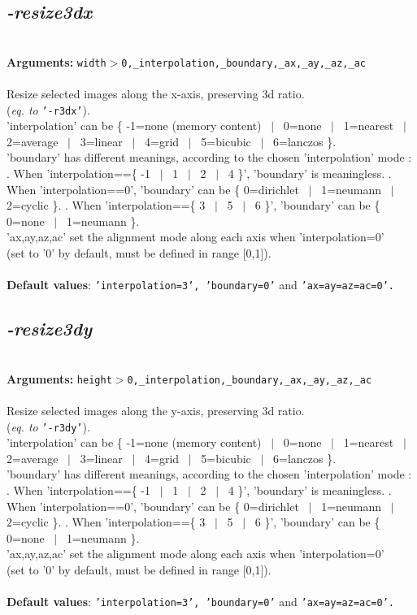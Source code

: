 \documentclass[a4paper,11pt,twoside]{book}
\begin{document}
\subsection{\emph{-resize3dx} }\vspace*{-0.5em}
~\\\textbf{Arguments: } 
{\small \texttt{width$>$0,\_interpolation,\_boundary,\_ax,\_ay,\_az,\_ac}}\\~\\
Resize selected images along the x-axis, preserving 3d ratio.
~\\(\emph{eq. to} {\small \texttt{'-r3dx'}}).
~\\'interpolation' can be \{ -1=none (memory content) ~$|$~ 0=none ~$|$~ 1=nearest ~$|$~ 2=average ~$|$~ 3=linear ~$|$~ 4=grid ~$|$~ 5=bicubic ~$|$~ 6=lanczos \}.
~\\'boundary' has different meanings, according to the chosen 'interpolation' mode :
. When 'interpolation==\{ -1 ~$|$~ 1 ~$|$~ 2 ~$|$~ 4 \}', 'boundary' is meaningless.
. When 'interpolation==0', 'boundary' can be \{ 0=dirichlet ~$|$~ 1=neumann ~$|$~ 2=cyclic \}.
. When 'interpolation==\{ 3 ~$|$~ 5 ~$|$~ 6 \}', 'boundary' can be \{ 0=none ~$|$~ 1=neumann \}.
~\\'ax,ay,az,ac' set the alignment mode along each axis when 'interpolation=0'
~\\(set to '0' by default, must be defined in range [0,1]).
~\\~\\\textbf{Default values}: {\small \texttt{'interpolation=3', 'boundary=0'} and \texttt{'ax=ay=az=ac=0'.}}


\subsection{\emph{-resize3dy} }\vspace*{-0.5em}
~\\\textbf{Arguments: } 
{\small \texttt{height$>$0,\_interpolation,\_boundary,\_ax,\_ay,\_az,\_ac}}\\~\\
Resize selected images along the y-axis, preserving 3d ratio.
~\\(\emph{eq. to} {\small \texttt{'-r3dy'}}).
~\\'interpolation' can be \{ -1=none (memory content) ~$|$~ 0=none ~$|$~ 1=nearest ~$|$~ 2=average ~$|$~ 3=linear ~$|$~ 4=grid ~$|$~ 5=bicubic ~$|$~ 6=lanczos \}.
~\\'boundary' has different meanings, according to the chosen 'interpolation' mode :
. When 'interpolation==\{ -1 ~$|$~ 1 ~$|$~ 2 ~$|$~ 4 \}', 'boundary' is meaningless.
. When 'interpolation==0', 'boundary' can be \{ 0=dirichlet ~$|$~ 1=neumann ~$|$~ 2=cyclic \}.
. When 'interpolation==\{ 3 ~$|$~ 5 ~$|$~ 6 \}', 'boundary' can be \{ 0=none ~$|$~ 1=neumann \}.
~\\'ax,ay,az,ac' set the alignment mode along each axis when 'interpolation=0'
~\\(set to '0' by default, must be defined in range [0,1]).
~\\~\\\textbf{Default values}: {\small \texttt{'interpolation=3', 'boundary=0'} and \texttt{'ax=ay=az=ac=0'.}}
\end{document}
